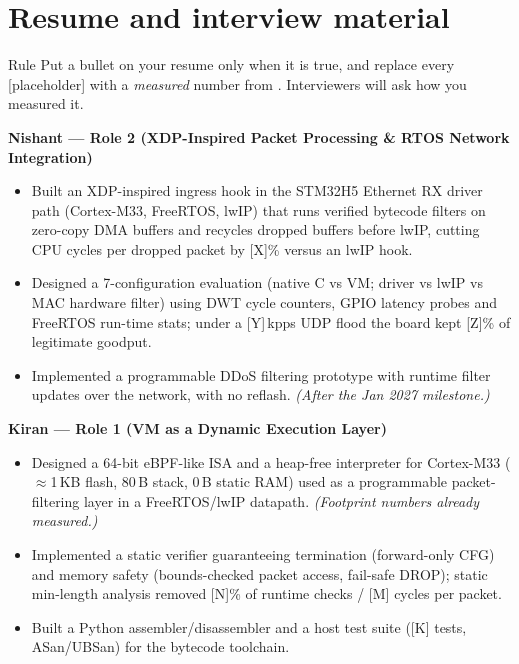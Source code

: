 \documentclass[10pt,a4paper]{article}
\begin{document}
\section{Resume and interview material}
\begin{warnbox}{Rule}
Put a bullet on your resume only when it is true, and replace every [placeholder] with a \emph{measured} number from . Interviewers will ask how you measured it.
\end{warnbox}

\textbf{Nishant --- Role 2 (XDP-Inspired Packet Processing \& RTOS Network Integration)}
\begin{itemize}
  \item Built an XDP-inspired ingress hook in the STM32H5 Ethernet RX driver path (Cortex-M33, FreeRTOS, lwIP) that runs verified bytecode filters on zero-copy DMA buffers and recycles dropped buffers before lwIP, cutting CPU cycles per dropped packet by [X]\% versus an lwIP  hook.
  \item Designed a 7-configuration evaluation (native C vs VM; driver vs lwIP vs MAC hardware filter) using DWT cycle counters, GPIO latency probes and FreeRTOS run-time stats; under a [Y]\,kpps UDP flood the board kept [Z]\% of legitimate goodput.
  \item Implemented a programmable DDoS filtering prototype with runtime filter updates over the network, with no reflash. \emph{(After the Jan 2027 milestone.)}
\end{itemize}

\textbf{Kiran --- Role 1 (VM as a Dynamic Execution Layer)}
\begin{itemize}
  \item Designed a 64-bit eBPF-like ISA and a heap-free interpreter for Cortex-M33 ($\approx$1\,KB flash, 80\,B stack, 0\,B static RAM) used as a programmable packet-filtering layer in a FreeRTOS/lwIP datapath. \emph{(Footprint numbers already measured.)}
  \item Implemented a static verifier guaranteeing termination (forward-only CFG) and memory safety (bounds-checked packet access, fail-safe DROP); static min-length analysis removed [N]\% of runtime checks / [M] cycles per packet.
  \item Built a Python assembler/disassembler and a host test suite ([K] tests, ASan/UBSan) for the bytecode toolchain.
\end{itemize}
\end{document}
